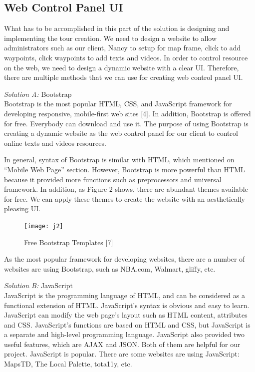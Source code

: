\documentclass[letterpaper, 10pt,titlepage]{article}
\begin{document}
\subsection{Web Control Panel UI}
What has to be accomplished in this part of the solution is designing and implementing the tour creation. We need to design a website to allow administrators such as our client, Nancy to setup for map frame, click to add waypoints, click waypoints to add texts and videos. In order to control resource on the web, we need to design a dynamic website with a clear UI. Therefore, there are multiple methods that we can use for creating web control panel UI.



\textit{Solution A:} Bootstrap\\
Bootstrap is the most popular HTML, CSS, and JavaScript framework for developing responsive, mobile-first web sites [4]. In addition, Bootstrap is offered for free. Everybody can download and use it. The purpose of using Bootstrap is creating a dynamic website as the web control panel for our client to control online texts and videos resources. 


In general, syntax of Bootstrap is similar with HTML, which mentioned on “Mobile Web Page” section. However, Bootstrap is more powerful than HTML because it provided more functions such as preprocessors and universal framework. In addition, as Figure 2 shows, there are abundant themes available for free. We can apply these themes to create the website with an aesthetically pleasing UI. 


\begin{figure}[ht]
    \centering
    \texttt{[image: j2]}
    \caption{Free Bootstrap Templates [7]}
    \label{jiawei2}
\end{figure}

As the most popular framework for developing websites, there are a number of websites are using Bootstrap, such as NBA.com, Walmart, gliffy, etc. 


\textit{Solution B:} JavaScript\\
JavaScript is the programming language of HTML, and can be considered as a functional extension of HTML. JavaScript’s syntax is obvious and easy to learn. JavaScript can modify the web page’s layout such as HTML content, attributes and CSS. JavaScript’s functions are based on HTML and CSS, but JavaScript is a separate and high-level programming language. JavaScript also provided two useful features, which are AJAX and JSON. Both of them are helpful for our project. JavaScript is popular. There are some websites are using JavaScript: MapsTD, The Local Palette, tota11y, etc.
\end{document}
